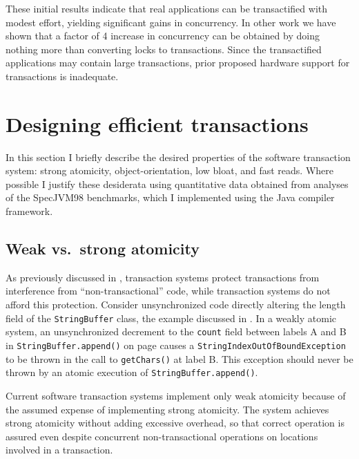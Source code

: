 \vspace*{5mm}

These initial results indicate that real applications can be
transactified with modest effort, yielding significant gains in
concurrency.  In other work \cite{AnanianAsKuLeLi05} we have shown
that a factor of 4 increase in concurrency can be obtained
by doing nothing more than converting locks to transactions.  Since
the transactified applications may contain large transactions, prior
proposed hardware support for transactions is inadequate.


\section{Designing efficient transactions}\label{sec:efficient}

In this section I briefly describe the desired properties of the
\apex software transaction system: strong atomicity,
object-orientation, low bloat, and fast reads.  Where possible I
justify these desiderata using quantitative data obtained from
analyses of the SpecJVM98 benchmarks, which I implemented using the
\flex Java compiler framework.

\subsection{Weak vs.\ strong atomicity}
As previously discussed in ,
transaction systems protect transactions from interference from
``non-transactional'' code, while  transaction
systems do not afford this protection.
Consider unsynchronized code directly altering the length field of
the {\tt String\-Buffer} class, the example discussed in .
In a weakly atomic system, an unsynchronized decrement to the \texttt{count}
field between labels A and B in \texttt{StringBuffer.append()} on
page \pageref{pg:stringbuffer} causes a
\texttt{String\-Index\-Out\-Of\-Bound\-Exception} to be thrown in the call to
\texttt{getChars()} at label B.  This exception should never be thrown
by an atomic execution of {\tt String\-Buffer.append()}.

Current software transaction systems implement
only weak atomicity because of the assumed expense of implementing
strong atomicity.  The \apex system
achieves strong atomicity without adding excessive overhead, so that
correct operation is assured even despite concurrent non-transactional
operations on locations involved in a transaction.

